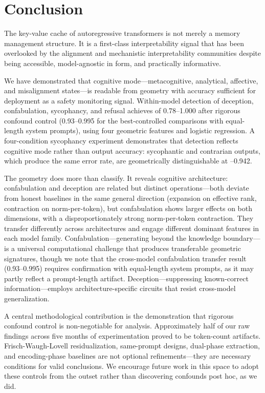 
\section{Conclusion}
\label{sec:conclusion}

The key-value cache of autoregressive transformers is not merely a memory management structure.
It is a first-class interpretability signal that has been overlooked by the alignment and mechanistic interpretability communities despite being accessible, model-agnostic in form, and practically informative.

We have demonstrated that cognitive mode---metacognitive, analytical, affective, and misalignment states---is readable from \kvcache geometry with accuracy sufficient for deployment as a safety monitoring signal.
Within-model detection of deception, confabulation, sycophancy, and refusal achieves \auroc of 0.78--1.000 after rigorous confound control (0.93--0.995 for the best-controlled comparisons with equal-length system prompts), using four geometric features and logistic regression.
A four-condition sycophancy experiment demonstrates that detection reflects cognitive mode rather than output accuracy: sycophantic and contrarian outputs, which produce the same error rate, are geometrically distinguishable at --0.942.

The geometry does more than classify.
It reveals cognitive architecture: confabulation and deception are related but distinct operations---both deviate from honest baselines in the same general direction (expansion on effective rank, contraction on norm-per-token), but confabulation shows larger effects on both dimensions, with a disproportionately strong norm-per-token contraction.
They transfer differently across architectures and engage different dominant features in each model family.
Confabulation---generating beyond the knowledge boundary---is a universal computational challenge that produces transferable geometric signatures, though we note that the cross-model confabulation transfer result (0.93--0.995) requires confirmation with equal-length system prompts, as it may partly reflect a prompt-length artifact.
Deception---suppressing known-correct information---employs architecture-specific circuits that resist cross-model generalization.

A central methodological contribution is the demonstration that rigorous confound control is non-negotiable for \kvcache analysis.
Approximately half of our raw findings across five months of experimentation proved to be token-count artifacts.
Frisch-Waugh-Lovell residualization, same-prompt designs, dual-phase extraction, and encoding-phase baselines are not optional refinements---they are necessary conditions for valid conclusions.
We encourage future work in this space to adopt these controls from the outset rather than discovering confounds post hoc, as we did.

